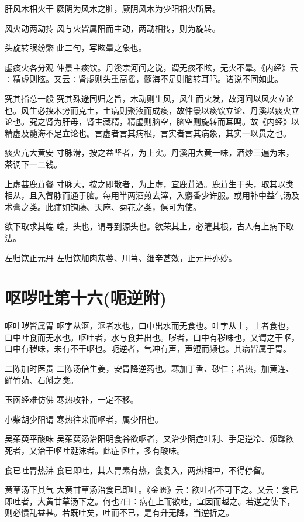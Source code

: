 \documentclass[a4paper,12pt,UTF8,twoside]{ctexbook}
\begin{document}
    肝风木相火干
    厥阴为风木之脏，厥阴风木为少阳相火所居。
    
    风火动两动抟
    风与火皆属阳而主动，两动相抟，则为旋转。
    
    头旋转眼纷繁
    此二句，写眩晕之象也。
    
    虚痰火各分观
    仲景主痰饮。丹溪宗河间之说，谓无痰不眩，无火不晕。《内经》云∶精虚则眩。又云∶肾虚则头重高摇，髓海不足则脑转耳鸣。诸说不同如此。
    
    究其指总一般
    究其殊途同归之旨，木动则生风，风生而火发，故河间以风火立论也。风生必挟木势而克土，土病则聚液而成痰，故仲景以痰饮立论、丹溪以痰火立论也。究之肾为肝母，肾主藏精，精虚则脑空，脑空则旋转而耳鸣。故《内经》以精虚及髓海不足立论也。言虚者言其病根，言实者言其病象，其实一以贯之也。
    
    痰火亢大黄安
    寸脉滑，按之益坚者，为上实。丹溪用大黄一味，酒炒三遍为末，茶调下一二钱。
    
    上虚甚鹿茸餐
    寸脉大，按之即散者，为上虚，宜鹿茸酒。鹿茸生于头，取其以类相从，且入督脉而通于脑。每用半两酒煎去滓，入麝香少许服。或用补中益气汤及术膏之类。此症如钩藤、天麻、菊花之类，俱可为使。
    
    欲下取求其端
    端，头也，谓寻到源头也。欲荣其上，必灌其根，古人有上病下取法。
    
    左归饮正元丹
    左归饮加肉苁蓉、川芎、细辛甚效，正元丹亦妙。
    
    
    
    \chapter{呕哕吐第十六(呃逆附)}
    呕吐哕皆属胃
    呕字从沤，沤者水也，口中出水而无食也。吐字从土，土者食也，口中吐食而无水也。呕吐者，水与食并出也。哕者，口中有秽味也，又谓之干呕，口中有秽味，未有不干呕也。呃逆者，气冲有声，声短而频也。其病皆属于胃。
    
    二陈加时医贵
    二陈汤倍生姜，安胃降逆药也。寒加丁香、砂仁；若热，加黄连、鲜竹茹、石斛之类。
    
    玉函经难仿佛
    寒热攻补，一定不移。
    
    小柴胡少阳谓
    寒热往来而呕者，属少阳也。
    
    吴茱萸平酸味
    吴茱萸汤治阳明食谷欲呕者，又治少阴症吐利、手足逆冷、烦躁欲死者，又治干呕吐涎沫者。此症呕吐，多有酸味。
    
    食已吐胃热沸
    食已即吐，其人胃素有热，食复入，两热相冲，不得停留。
    
    黄草汤下其气
    大黄甘草汤治食已即吐。《金匮》云∶欲吐者不可下之。又云∶食已即吐者，大黄甘草汤下之。何也?曰∶病在上而欲吐，宜因而越之。若逆之使下，则必愦乱益甚。若既吐矣，吐而不已，是有升无降，当逆折之。
    
\end{document}
